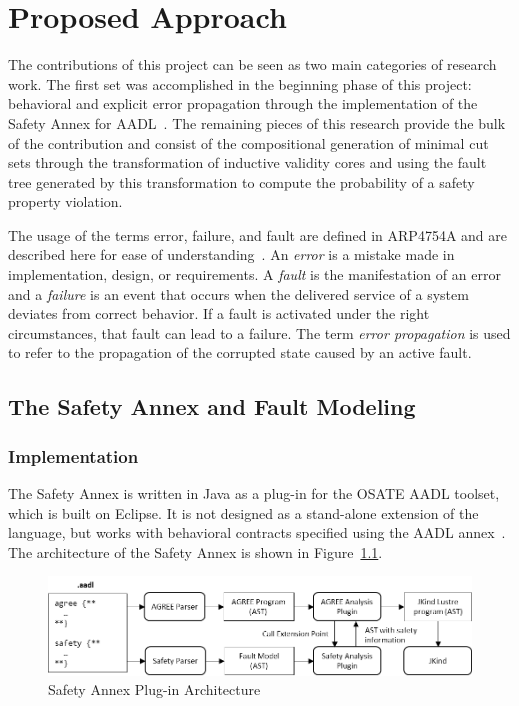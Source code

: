 \chapter{Proposed Approach}
\label{ch:prop}

The contributions of this project can be seen as two main categories of research work. The first set was accomplished in the beginning phase of this project: behavioral and explicit error propagation through the implementation of the Safety Annex for AADL~\cite{Stewart17:IMBSA,stewart2020safety}. The remaining pieces of this research provide the bulk of the contribution and consist of the compositional generation of minimal cut sets through the transformation of inductive validity cores and using the fault tree generated by this transformation to compute the probability of a safety property violation. 

The usage of the terms error, failure, and fault are defined in ARP4754A and are described here for ease of understanding~\cite{SAE:ARP4754A}. An \textit{error} is a mistake made in implementation, design, or requirements. A \textit{fault} is the manifestation of an error and a \textit{failure} is an event that occurs when the delivered service of a system deviates from correct behavior. If a fault is activated under the right circumstances, that fault can lead to a failure. The term \textit{error propagation} is used to refer to the propagation of the corrupted state caused by an active fault.

\section{The Safety Annex and Fault Modeling}
\subsection{Implementation}
The Safety Annex is written in Java as a plug-in for the OSATE AADL toolset, which is built on Eclipse.  It is not designed as a stand-alone extension of the language, but works with behavioral contracts specified using the \agree AADL annex~\cite{NFM2012:CoGaMiWhLaLu}. 
The architecture of the Safety Annex is shown in Figure~\ref{fig:plugin-arch}.

\begin{figure}[h!]
	\begin{center}
		\includegraphics[width=\textwidth]{images/arch.png}
	\end{center}
	\caption{Safety Annex Plug-in Architecture}
	\label{fig:plugin-arch}
\end{figure}

